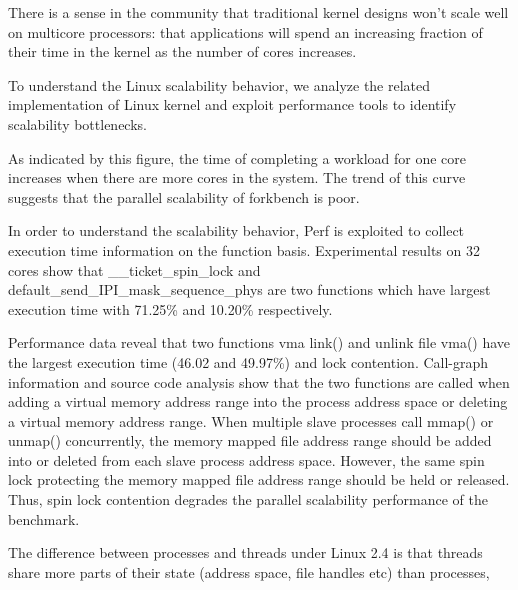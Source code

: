 There is a sense in the community that traditional kernel
designs won’t scale well on multicore processors: that
applications will spend an increasing fraction of their time
in the kernel as the number of cores increases.

To understand the Linux scalability
behavior, we analyze the related implementation of Linux
kernel and exploit performance tools to identify scalability
bottlenecks.


As indicated by this figure, the time of completing
a workload for one core increases when there are more
cores in the system. The trend of this curve suggests that
the parallel scalability of forkbench is poor.

In order to understand the scalability behavior, 
Perf\cite{} is exploited to collect execution time information
on the function basis. 
Experimental results on 32 cores
show that \_\_ticket\_spin\_lock and 
default\_send\_IPI\_mask\_sequence\_phys are two functions 
which have largest execution time with 71.25\% and 10.20\% respectively. 

Performance data reveal that two functions vma link() and
unlink file vma() have the largest execution time (46.02%
and 49.97\%) and lock contention. Call-graph information
and source code analysis show that the two functions are
called when adding a virtual memory address range into the
process address space or deleting a virtual memory address range. 
When multiple slave processes call mmap() or unmap() concurrently, the 
memory mapped file address range should be added into or 
deleted from each slave process address space. However, 
the same spin lock protecting the memory mapped file 
address range should be held or released. Thus, spin lock 
contention degrades the parallel scalability performance of 
the benchmark. 



The difference between processes and threads under Linux 2.4 is that threads share more parts of their state (address space, file handles etc) than processes, 
